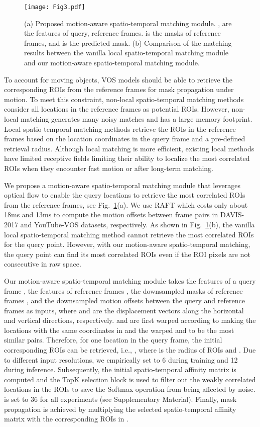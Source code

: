 \documentclass[letterpaper]{article} \usepackage{aaai22}  \usepackage{times}  \usepackage{helvet}  \usepackage{courier}  \usepackage[hyphens]{url}  \usepackage{graphicx} \urlstyle{rm} \def\UrlFont{\rm}  \usepackage{natbib}  \usepackage{caption} \DeclareCaptionStyle{ruled}{labelfont=normalfont,labelsep=colon,strut=off} \frenchspacing  \setlength{\pdfpagewidth}{8.5in}  \setlength{\pdfpageheight}{11in}  \usepackage{algorithm}
\begin{document}
\begin{figure}[t!] \centering
\texttt{[image: Fig3.pdf]}
\caption{(a) Proposed motion-aware spatio-temporal matching module. ,  are the features of query, reference frames.  is the masks of reference frames, and  is the predicted mask. (b) Comparison of the matching results between the vanilla local spatio-temporal matching module and our motion-aware spatio-temporal matching module.}
\label{fig:3}
\end{figure}


To account for moving objects, VOS models should be able to retrieve the corresponding ROIs from the reference frames for mask propagation under motion. To meet this constraint, non-local spatio-temporal matching methods \cite{STM} consider all locations in the reference frames as potential ROIs. However, non-local matching generates many noisy matches and has a large memory footprint. Local spatio-temporal matching methods \cite{MAST} retrieve the ROIs in the reference frames based on the location coordinates in the query frame and a pre-defined retrieval radius. Although local matching is more efficient, existing local methods have limited receptive fields limiting their ability to localize the most correlated ROIs when they encounter fast motion or after long-term matching.

We propose a motion-aware spatio-temporal matching module that leverages optical flow to enable the query locations to retrieve the most correlated ROIs from the reference frames, see Fig.~\ref{fig:3}(a). We use RAFT \cite{RAFT} which costs only about 18ms and 13ms to compute the motion offsets between frame pairs in DAVIS-2017 and YouTube-VOS datasets, respectively. As shown in Fig.~\ref{fig:3}(b), the vanilla local spatio-temporal matching method cannot retrieve the most correlated ROIs for the query point. However, with our motion-aware spatio-temporal matching, the query point can find its most correlated ROIs even if the ROI pixels are not consecutive in raw space.

Our motion-aware spatio-temporal matching module takes the features of a query frame , the features of reference frames , the downsampled masks of reference frames , and the downsampled motion offsets  between the query and reference frames as inputs, where  and  are the displacement vectors along the horizontal and vertical directions, respectively.  and  are first warped according to  making the locations with the same coordinates in  and the warped  and  to be the most similar pairs. Therefore, for one location  in the query frame, the initial corresponding ROIs can be retrieved, i.e., , where  is the radius of ROIs and . Due to different input resolutions, we empirically set  to 6 during training and 12 during inference. Subsequently, the initial spatio-temporal affinity matrix is computed and the TopK selection block is used to filter out the weakly correlated locations in the ROIs to save the Softmax operation from being affected by noise.  is set to 36 for all experiments (see Supplementary Material). Finally, mask propagation is achieved by multiplying the selected spatio-temporal affinity matrix with the corresponding ROIs in .
\end{document}
